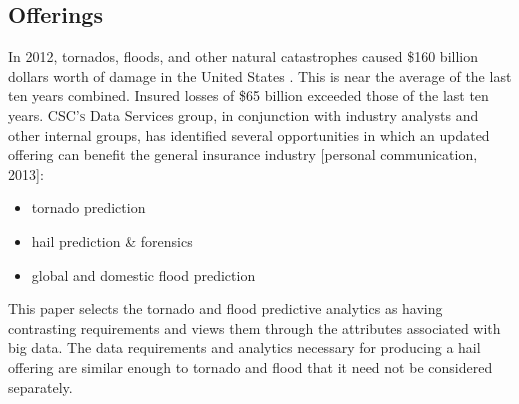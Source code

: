 \subsection{Offerings}
In 2012, tornados, floods, and other natural catastrophes caused \$160  billion dollars worth of damage in the United States \cite{stalder}. This is near the average of the last ten years combined. Insured losses of \$65 billion exceeded those of the last ten years. \textsc{CSC's} Data Services group, in conjunction with industry analysts and other internal groups, has identified several opportunities  in which an updated \climatedge offering can benefit the general insurance industry [personal communication, 2013]:
\begin{itemize}
    \item tornado prediction
    \item hail prediction \& forensics
    \item global and domestic flood prediction
\end{itemize}
This paper selects the tornado and flood predictive analytics as having contrasting requirements and views them through the attributes associated with big data. The data requirements and analytics necessary for producing a hail offering are similar enough to tornado and flood that it need not be considered separately.